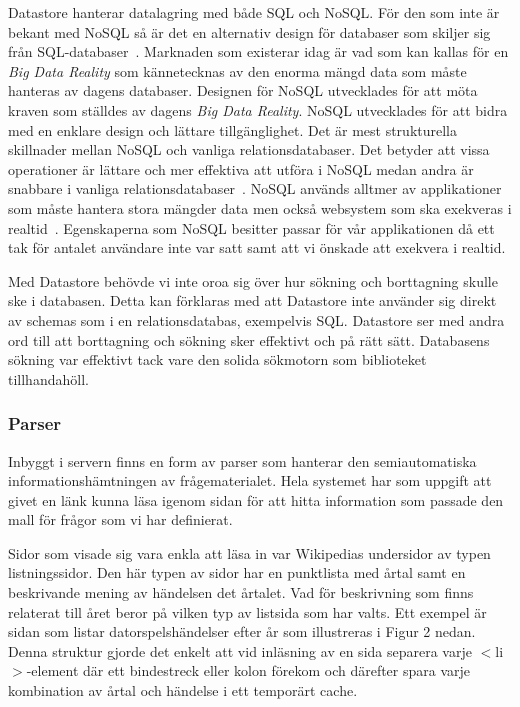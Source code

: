 \documentclass[a4paper, 11pt]{article}
\begin{document}
Datastore hanterar datalagring med både SQL och NoSQL. För den som inte är bekant med NoSQL så är det en alternativ design för databaser som skiljer sig från SQL-databaser~\cite{nosql}. Marknaden som existerar idag är vad som kan kallas för en \textit{Big Data Reality} som kännetecknas av den enorma mängd data som måste hanteras av dagens databaser. Designen för NoSQL utvecklades för att möta kraven som ställdes av dagens \textit{Big Data Reality}. NoSQL utvecklades för att bidra med en enklare design och lättare tillgänglighet. Det är mest strukturella skillnader mellan NoSQL och vanliga relationsdatabaser. Det betyder att vissa operationer är lättare och mer effektiva att utföra i NoSQL medan andra är snabbare i vanliga relationsdatabaser~\cite[1--3]{nosqlfacts}. NoSQL används alltmer av applikationer som måste hantera stora mängder data men också websystem som ska exekveras i realtid~\cite{nosqlcloud}. Egenskaperna som NoSQL besitter passar för vår applikationen då ett tak för antalet användare inte var satt samt att vi önskade att exekvera i realtid.

Med Datastore behövde vi inte oroa sig över hur sökning och borttagning skulle ske i databasen. Detta kan förklaras med att Datastore inte använder sig direkt av schemas som i en relationsdatabas, exempelvis SQL. Datastore ser med andra ord till att borttagning och sökning sker effektivt och på rätt sätt. Databasens sökning var effektivt tack vare den solida sökmotorn som biblioteket tillhandahöll.

\subsubsection{Parser} \label{crawler}
Inbyggt i servern finns en form av parser som hanterar den semiautomatiska informationshämtningen av frågematerialet. Hela systemet har som uppgift att givet en länk kunna läsa igenom sidan för att hitta information som passade den mall för frågor som vi har definierat. 

Sidor som visade sig vara enkla att läsa in var Wikipedias undersidor av typen listningssidor. Den här typen av sidor har en punktlista med årtal samt en beskrivande mening av händelsen det årtalet. Vad för beskrivning som finns relaterat till året beror på vilken typ av listsida som har valts. Ett exempel är sidan som listar datorspelshändelser efter år som illustreras i Figur 2 nedan.
Denna struktur gjorde det enkelt att vid inläsning av en sida separera varje $<$li$>$-element där ett bindestreck eller kolon förekom och därefter spara varje kombination av årtal och händelse i ett temporärt cache.
\end{document}
